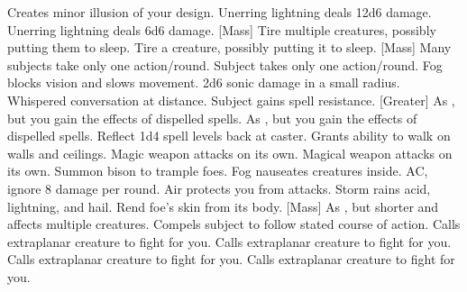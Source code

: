     {Creates minor illusion of your design.}
    {Unerring lightning deals 12d6 damage.}
    {Unerring lightning deals 6d6 damage.}
[Mass]
    {Tire multiple creatures, possibly putting them to sleep.}
    {Tire a creature, possibly putting it to sleep.}
[Mass]
    {Many subjects take only one action/round.}
    {Subject takes only one action/round.}
    {Fog blocks vision and slows movement.}
    {2d6 sonic damage in a small radius.}
    {Whispered conversation at distance.}
    {Subject gains spell resistance.}
[Greater]
    {As , but you gain the effects of dispelled spells.}
    {As , but you gain the effects of dispelled spells.}
    {Reflect 1d4 spell levels back at caster.}
    {Grants ability to walk on walls and ceilings.}
    {Magic weapon attacks on its own.}
    {Magical weapon attacks on its own.}
    {Summon bison to trample foes.}
    {Fog nauseates creatures inside.}
    { AC, ignore 8 damage per round.}
    {Air protects you from attacks. }
    {Storm rains acid, lightning, and hail.}
    {Rend foe's skin from its body.}
[Mass]
    {As , but shorter and affects multiple creatures.}
    {Compels subject to follow stated course of action.}
    {Calls extraplanar creature to fight for you.}
    {Calls extraplanar creature to fight for you.}
    {Calls extraplanar creature to fight for you.}
    {Calls extraplanar creature to fight for you.}
